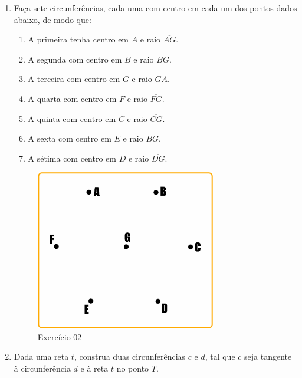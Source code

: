 \documentclass[11pt,a4paper]{article}
\begin{document}
\begin{enumerate}[{Exercício} 1.]
\item Faça sete circunferências, cada uma com centro em cada um dos pontos dados abaixo, de modo que:
\begin{enumerate}
    \item A primeira tenha centro em $A$ e raio $\overline{AG}$.
    \item A segunda com centro em $B$ e raio $\overline{BG}$.
    \item A terceira com centro em $G$ e raio $\overline{GA}$.
    \item A quarta com centro em $F$ e raio $\overline{FG}$.
    \item A quinta com centro em $C$ e raio $\overline{CG}$.
    \item A sexta com centro em $E$ e raio $\overline{BG}$.
    \item A sétima com centro em $D$ e raio $\overline{DG}$.
\end{enumerate}
\begin{figure}[H]
    \centering
    \includegraphics[height=7cm]{Figuras/T01_Exercicio02.png}
    \caption{Exercício 02}
\end{figure}

\item Dada uma reta $t$, construa duas circunferências $c$ e $d$, tal que $c$ seja tangente à circunferência $d$ e à reta $t$ no ponto $T$.

\end{enumerate}




\end{document}
